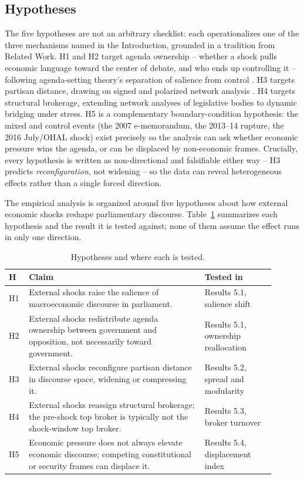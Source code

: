 \documentclass[conference]{IEEEtran}
\begin{document}
\subsection{Hypotheses}
The five hypotheses are not an arbitrary checklist: each operationalizes one of the three mechanisms named in the Introduction, grounded in a tradition from Related Work. H1 and H2 target agenda ownership -- whether a shock pulls economic language toward the center of debate, and who ends up controlling it -- following agenda-setting theory's separation of salience from control \cite{kleinnijenhuis1995}. H3 targets partisan distance, drawing on signed and polarized network analysis \cite{bonchi2019, blohm2026}. H4 targets structural brokerage, extending network analyses of legislative bodies \cite{porter2005} to dynamic bridging under stress. H5 is a complementary boundary-condition hypothesis: the mixed and control events (the 2007 e-memorandum, the 2013--14 rupture, the 2016 July/OHAL shock) exist precisely so the analysis can ask whether economic pressure wins the agenda, or can be displaced by non-economic frames. Crucially, every hypothesis is written as non-directional and falsifiable either way -- H3 predicts \emph{reconfiguration}, not widening -- so the data can reveal heterogeneous effects rather than a single forced direction.

The empirical analysis is organized around five hypotheses about how external economic shocks reshape parliamentary discourse. Table~\ref{tab:hypotheses} summarizes each hypothesis and the result it is tested against; none of them assume the effect runs in only one direction.

\begin{table}[!t]
\centering
\caption{Hypotheses and where each is tested.}
\label{tab:hypotheses}
\small
\begin{tabular}{p{0.06\linewidth} p{0.6\linewidth} p{0.24\linewidth}}
\hline
\textbf{H} & \textbf{Claim} & \textbf{Tested in} \\
\hline
H1 & External shocks raise the salience of macroeconomic discourse in parliament. & Results 5.1, salience shift \\
H2 & External shocks redistribute agenda ownership between government and opposition, not necessarily toward government. & Results 5.1, ownership reallocation \\
H3 & External shocks reconfigure partisan distance in discourse space, widening or compressing it. & Results 5.2, spread and modularity \\
H4 & External shocks reassign structural brokerage; the pre-shock top broker is typically not the shock-window top broker. & Results 5.3, broker turnover \\
H5 & Economic pressure does not always elevate economic discourse; competing constitutional or security frames can displace it. & Results 5.4, displacement index \\
\hline
\end{tabular}
\end{table}
\end{document}

